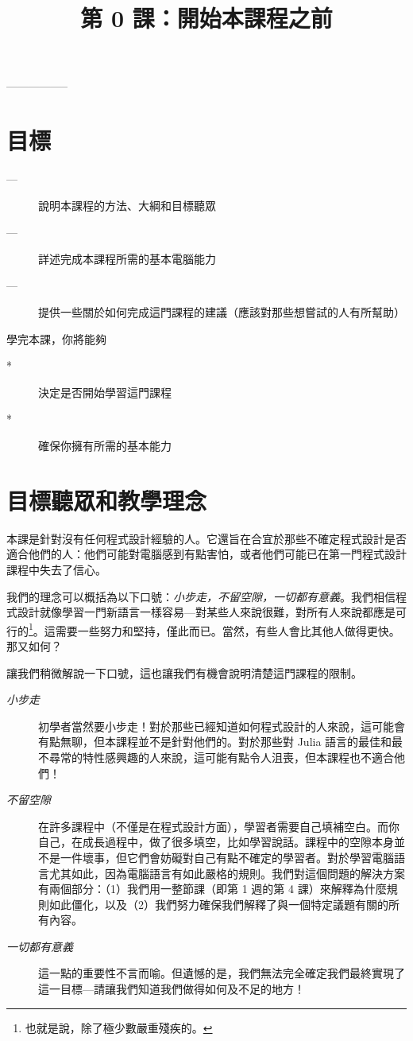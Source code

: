 \documentclass[]{article}
\begin{document}
\author{}  \date{}
\title{第 0 課：開始本課程之前}
\maketitle

\vspace{-4em}
-----------------

\section*{目標}

\begin{description}
	\item[---] 說明本課程的方法、大綱和目標聽眾
	\item[---] 詳述完成本課程所需的基本電腦能力
	\item[---] 提供一些關於如何完成這門課程的建議（應該對那些想嘗試的人有所幫助）
\end{description}

學完本課，你將能夠
\begin{description}
	\item[*] 決定是否開始學習這門課程
	\item[*] 確保你擁有所需的基本能力
\end{description}

\section*{目標聽眾和教學理念}

本課是針對沒有任何程式設計經驗的人。它還旨在合宜於那些不確定程式設計是否適合他們的人：他們可能對電腦感到有點害怕，或者他們可能已在第一門程式設計課程中失去了信心。

我們的理念可以概括為以下口號：\emph{小步走，不留空隙，一切都有意義}。我們相信程式設計就像學習一門新語言一樣容易---對某些人來說很難，對所有人來說都應是可行的\footnote{也就是說，除了極少數嚴重殘疾的。}。這需要一些努力和堅持，僅此而已。當然，有些人會比其他人做得更快。那又如何？

讓我們稍微解說一下口號，這也讓我們有機會說明清楚這門課程的限制。

\begin{description}
	\item[\emph{小步走}] 初學者當然要小步走！對於那些已經知道如何程式設計的人來說，這可能會有點無聊，但本課程並不是針對他們的。對於那些對 Julia 語言的最佳和最不尋常的特性感興趣的人來說，這可能有點令人沮喪，但本課程也不適合他們！
  \item[\emph{不留空隙}] 在許多課程中（不僅是在程式設計方面），學習者需要自己填補空白。而你自己，在成長過程中，做了很多填空，比如學習說話。課程中的空隙本身並不是一件壞事，但它們會妨礙對自己有點不確定的學習者。對於學習電腦語言尤其如此，因為電腦語言有如此嚴格的規則。我們對這個問題的解決方案有兩個部分：（1）我們用一整節課（即第 1 週的第 4 課）來解釋為什麼規則如此僵化，以及（2）我們努力確保我們解釋了與一個特定議題有關的所有內容。
  \item[\emph{一切都有意義}] 這一點的重要性不言而喻。但遺憾的是，我們無法完全確定我們最終實現了這一目標---請讓我們知道我們做得如何及不足的地方！
\end{description}
\end{document}
